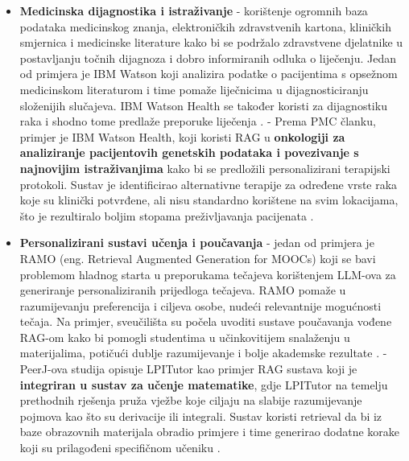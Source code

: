 \documentclass[]{foi}
\begin{document}
\begin{itemize}
    \item \textbf{Medicinska dijagnostika i istraživanje} - korištenje ogromnih baza podataka medicinskog znanja, elektroničkih zdravstvenih kartona, kliničkih 
    smjernica i medicinske literature kako bi se podržalo zdravstvene djelatnike u postavljanju točnih dijagnoza i dobro informiranih odluka o liječenju. 
    Jedan od primjera je IBM Watson koji analizira podatke o pacijentima s opsežnom medicinskom literaturom i time pomaže liječnicima u dijagnosticiranju
    složenijih slučajeva. IBM Watson Health se također koristi za dijagnostiku raka i shodno tome predlaže preporuke liječenja \cite{nishtha2025rag}.
    \subitem - Prema PMC članku, primjer je IBM Watson Health, koji koristi RAG u \textbf{onkologiji za analiziranje pacijentovih genetskih podataka i povezivanje s najnovijim istraživanjima}
    kako bi se predložili personalizirani terapijski protokoli. Sustav je identificirao alternativne terapije za određene vrste raka koje su klinički potvrđene, ali nisu standardno korištene
    na svim lokacijama, što je rezultiralo boljim stopama preživljavanja pacijenata \cite{Gargari2025}. 

    \item \textbf{Personalizirani sustavi učenja i poučavanja} - jedan od primjera je RAMO (eng. Retrieval Augmented Generation for MOOCs) koji se bavi problemom hladnog starta u preporukama tečajeva
    korištenjem LLM-ova za generiranje personaliziranih prijedloga tečajeva. RAMO pomaže u razumijevanju preferencija i ciljeva osobe, nudeći relevantnije mogućnosti tečaja.
    Na primjer, sveučilišta su počela uvoditi sustave poučavanja vođene RAG-om kako bi pomogli studentima u učinkovitijem snalaženju u materijalima, potičući dublje razumijevanje i bolje akademske rezultate \cite{nishtha2025rag}.
    \subitem - PeerJ-ova studija opisuje LPITutor kao primjer RAG sustava koji je \textbf{integriran u sustav za učenje matematike}, gdje LPITutor na temelju prethodnih rješenja pruža vježbe koje ciljaju 
    na slabije razumijevanje pojmova kao što su derivacije ili integrali. Sustav koristi retrieval da bi iz baze obrazovnih materijala obradio primjere i time generirao dodatne korake 
    koji su prilagođeni specifičnom učeniku \cite{Liu2025}. 


\end{itemize}
\end{document}

